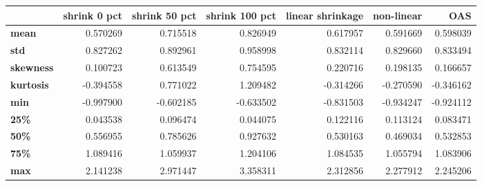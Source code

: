 \begin{tabular}{lrrrrrr}
\toprule
{} &  shrink 0 pct &  shrink 50 pct &  shrink 100 pct &  linear shrinkage &  non-linear &       OAS \\
\midrule
\textbf{mean    } &      0.570269 &       0.715518 &        0.826949 &          0.617957 &    0.591669 &  0.598039 \\
\textbf{std     } &      0.827262 &       0.892961 &        0.958998 &          0.832114 &    0.829660 &  0.833494 \\
\textbf{skewness} &      0.100723 &       0.613549 &        0.754595 &          0.220716 &    0.198135 &  0.166657 \\
\textbf{kurtosis} &     -0.394558 &       0.771022 &        1.209482 &         -0.314266 &   -0.270590 & -0.346162 \\
\textbf{min     } &     -0.997900 &      -0.602185 &       -0.633502 &         -0.831503 &   -0.934247 & -0.924112 \\
\textbf{25\%     } &      0.043538 &       0.096474 &        0.044075 &          0.122116 &    0.113124 &  0.083471 \\
\textbf{50\%     } &      0.556955 &       0.785626 &        0.927632 &          0.530163 &    0.469034 &  0.532853 \\
\textbf{75\%     } &      1.089416 &       1.059937 &        1.204106 &          1.084535 &    1.055794 &  1.083906 \\
\textbf{max     } &      2.141238 &       2.971447 &        3.358311 &          2.312856 &    2.277912 &  2.245206 \\
\bottomrule
\end{tabular}
